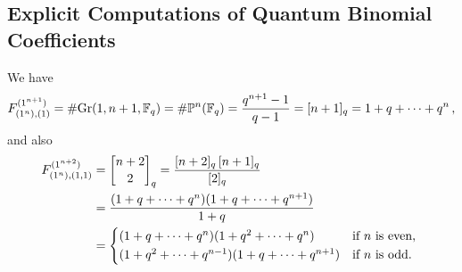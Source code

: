 \documentclass[a4paper,11pt]{scrartcl}
\begin{document}
\subsection{Explicit Computations of Quantum Binomial Coefficients}
\label{examples of quantum binomial coefficients}

We have
\[
  F^{(1^{n+1})}_{(1^n),(1)}
  =
  \# {\operatorname{Gr}(1, n+1, \mathbb{F}_q)}
  = 
  \# {\mathbb{P}^n(\mathbb{F}_q)}
  =
  \frac{ q^{n+1} - 1 }{ q - 1 }
  =
  [n+1]_q
  =
  1 + q + \dotsb + q^n \,,
\]
and also
\begin{align*}
  F^{(1^{n+2})}_{(1^n),(1,1)}
  &=
  \qbinom{n+2}{2}_q
  =
  \frac{[n+2]_q \, [n+1]_q}{[2]_q}
  \\
  &=
  \frac{ (1 + q + \dotsb + q^n) (1 + q + \dotsb + q^{n+1}) }{ 1 + q }
  \\
  &=
  \begin{cases*}
    (1 + q + \dotsb + q^n) (1 + q^2 + \dotsb + q^n)
    &
    if~$n$ is even,
    \\
    (1 + q^2 + \dotsb + q^{n-1}) (1 + q + \dotsb + q^{n+1})
    &
    if~$n$ is odd.
  \end{cases*}
\end{align*}
\end{document}
